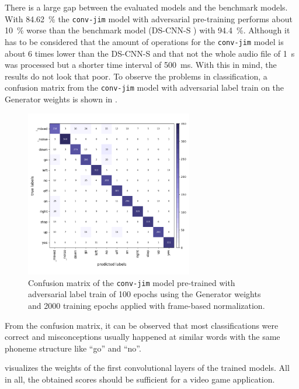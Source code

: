 There is a large gap between the evaluated models and the benchmark models.
With \SI{84.62}{\percent} the \texttt{conv-jim} model with adversarial pre-training performs about \SI{10}{\percent} worse than the benchmark model (DS-CNN-S \cite{Zhang2017}) with \SI{94.4}{\percent}.
Although it has to be considered that the amount of operations for the \texttt{conv-jim} model is about 6 times lower than the DS-CNN-S and that not the whole audio file of \SI{1}{\second} was processed but a shorter time interval of \SI{500}{\milli\second}.
With this in mind, the results do not look that poor.
To observe the problems in classification, a confusion matrix from the \texttt{conv-jim} model with adversarial label train on the Generator weights is shown in .
\begin{figure}[!ht]
  \centering
  \includegraphics[width=0.65\textwidth]{./5_exp/figs/exp_final_confusion.png}
  \caption{Confusion matrix of the \texttt{conv-jim} model pre-trained with adversarial label train of 100 epochs using the Generator weights and 2000 training epochs applied with frame-based normalization.}
  \label{fig:exp_final_confusion}
\end{figure}
\FloatBarrier
\noindent
From the confusion matrix, it can be observed that most classifications were correct and misconceptions usually happened at similar words with the same phoneme structure like \enquote{go} and \enquote{no}.

 visualizes the weights of the first convolutional layers of the trained models.
All in all, the obtained scores should be sufficient for a video game application.